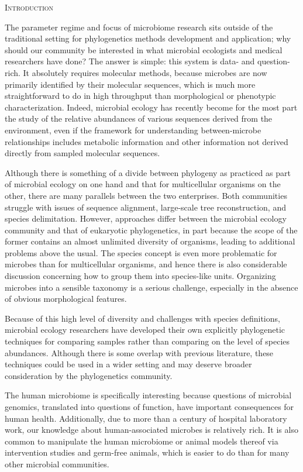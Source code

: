 \documentclass{amsart}
\renewcommand{\section}[1]{%
\bigskip
\begin{center}
\begin{Large}
\normalfont\scshape #1
\medskip
\end{Large}
\end{center}}
\begin{document}
\section{Introduction}

The parameter regime and focus of microbiome research sits outside of the traditional setting for phylogenetics methods development and application; why should our community be interested in what microbial ecologists and medical researchers have done?
The answer is simple: this system is data- and question-rich.
It absolutely requires molecular methods, because microbes are now primarily identified by their molecular sequences, which is much more straightforward to do in high throughput than morphological or phenotypic characterization.
Indeed, microbial ecology has recently become for the most part the study of the relative abundances of various sequences derived from the environment, even if the framework for understanding between-microbe relationships includes metabolic information and other information not derived directly from sampled molecular sequences.

Although there is something of a divide between phylogeny as practiced as part of microbial ecology on one hand and that for multicellular organisms on the other, there are many parallels between the two enterprises.
Both communities struggle with issues of sequence alignment, large-scale tree reconstruction, and species delimitation.
However, approaches differ between the microbial ecology community and that of eukaryotic phylogenetics, in part because the scope of the former contains an almost unlimited diversity of organisms, leading to additional problems above the usual.
The species concept is even more problematic for microbes than for multicellular organisms, and hence there is also considerable discussion concerning how to group them into species-like units.
Organizing microbes into a sensible taxonomy is a serious challenge, especially in the absence of obvious morphological features.

Because of this high level of diversity and challenges with species definitions, microbial ecology researchers have developed their own explicitly phylogenetic techniques for comparing samples rather than comparing on the level of species abundances.
Although there is some overlap with previous literature, these techniques could be used in a wider setting and may deserve broader consideration by the phylogenetics community.

The human microbiome is specifically interesting because questions of microbial genomics, translated into questions of function, have important consequences for human health.
Additionally, due to more than a century of hospital laboratory work, our knowledge about human-associated microbes is relatively rich.
It is also common to manipulate the human microbiome or animal models thereof via intervention studies and germ-free animals, which is easier to do than for many other microbial communities.
\end{document}
